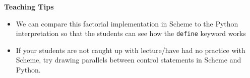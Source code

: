 \begin{blocksection}
\begin{comment}
\begin{lstlisting}
scm> (eq? '() nil)
\end{lstlisting}
\begin{solution}[.25in]
\texttt{\#t}
\end{solution}

\begin{lstlisting}
scm> (pair? (cons 1 2))
\end{lstlisting}
\begin{solution}[.25in]
\texttt{\#t}
\end{solution}

\begin{lstlisting}
scm> (list? (cons 1 2))
\end{lstlisting}
\begin{solution}[.25in]
\texttt{\#f}
\end{solution}
\end{comment}
\end{blocksection}

\begin{guide}
\begin{blocksection}
\textbf{Teaching Tips}
\begin{itemize}
  \item We can compare this factorial implementation in Scheme to the Python interpretation so that the students can see how the \lstinline{define} keyword works
  \item If your students are not caught up with lecture/have had no practice with Scheme, try drawing parallels between control statements in Scheme and Python.
\end{itemize}
\end{blocksection}
\end{guide}